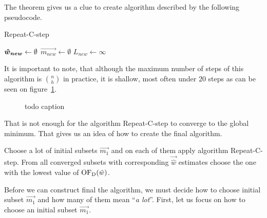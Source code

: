 
The theorem gives us a clue to create algorithm described by the following pseudocode.

\begin{algorithm}[H]
    \label{alg:RepeatCstep}
    \caption{Repeat-C-step}
    $\boldsymbol{\hat{w}_{new}} \gets \emptyset$\;
    $\vec{m_{new}} \gets \emptyset$\;
    $L_{new} \gets \infty $\;


    \;
\end{algorithm}

It is important to note, that although the maximum number of steps of this algorithm is ${n \choose h}$ in practice, it is shallow, most often under $20$ steps as can be seen on figure~\ref{figure:repeat:c:steps:cnt:converge}.

\begin{figure}[h]
\centering
{}
\caption{todo caption}
\label{figure:repeat:c:steps:cnt:converge}
\end{figure}

That is not enough for the algorithm Repeat-C-step to converge to the global minimum. That gives us an idea of how to create the final algorithm. \cite{rouss:2000}

Choose a lot of initial subsets $\vec{m_1}$ and on each of them apply algorithm Repeat-C-step. From all converged subsets with corresponding $\vec{\hat{w}}$ estimates choose the one with the lowest value of $\operatorname{OF_D}(\hat{w})$. 

Before we can construct final the algorithm, we must decide how to choose initial subset $\vec{m_1}$ and how many of them mean ``\emph{a lot}''. First, let us focus on how to choose an initial subset $\vec{m_1}$.



